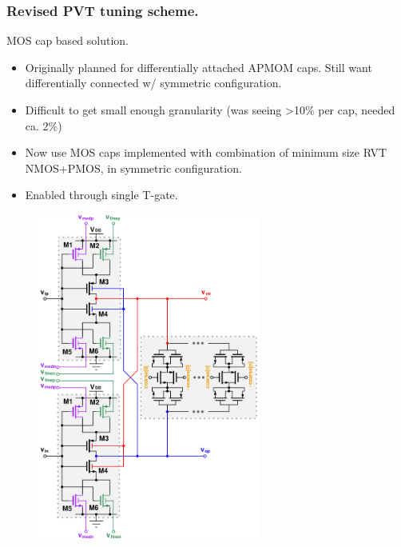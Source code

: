 \documentclass[t, screen, aspectratio=43]{beamer}
\begin{document}
\begin{frame}
	\frametitle{Revised PVT tuning scheme.}
	\begin{block}{MOS cap based solution.}
		\begin{minipage}{6cm}
			\vspace{1em}
			\tiny

			\begin{itemize}[itemsep=4pt,label=\protect---]
				\item Originally planned for differentially attached APMOM caps. Still want differentially connected w/ symmetric configuration.
				\item Difficult to get small enough granularity (was seeing >10\% per cap, needed ca. 2\%)
				\item Now use MOS caps implemented with combination of minimum size RVT NMOS+PMOS, in symmetric configuration.
				\item Enabled through single T-gate.
			\end{itemize}

		\end{minipage}%
		\begin{minipage}{6cm}
			\begin{figure}[htb!]
			        \centering
			        \includegraphics[width=0.65\textwidth, angle=0]{telescopic_pseudodiff_delay_cell_all_tune2}
			\end{figure}
		\end{minipage}%

	\end{block}	
\end{frame}
\end{document}
